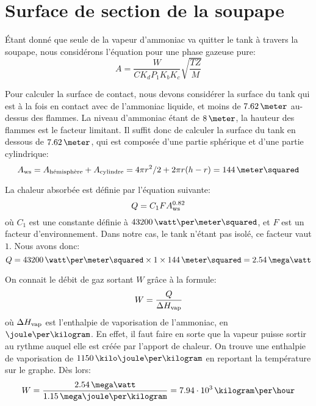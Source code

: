 \section{Surface de section de la soupape}
Étant donné que seule de la vapeur d'ammoniac
va quitter le tank à travers la soupape,
nous considérons l'équation pour une phase gazeuse pure:
\begin{equation}
    \label{eq:big-surface}
    A=\frac{W}{CK_dP_1K_bK_c} \sqrt{\frac{TZ}{M}}
\end{equation}

Pour calculer la surface de contact,
nous devons considérer la surface du tank qui est à la fois en contact
avec de l'ammoniac liquide, et moins de $7.62\,\meter$ au-dessus des flammes.
La niveau d'ammoniac étant de $8\,\meter$,
la hauteur des flammes est le facteur limitant.
Il suffit donc de calculer la surface du tank en dessous de $7.62\,\meter$,
qui est composée d'une partie sphérique et d'une partie cylindrique:
\begin{equation*}
    A\ind{ws} = A\ind{hémisphère} + A\ind{cylindre}
    = 4\pi r^2/2 + 2\pi r (h-r)
    = 144\,\meter\squared
\end{equation*}

La chaleur absorbée est définie par l'équation suivante:
\begin{equation}
    Q = C_1 F A_{\mbox{\scriptsize{ws}}}^{0.82}
\end{equation}
où $C_1$ est une constante définie à $43200\,\watt\per\meter\squared$,
et $F$ est un facteur
d'environnement. Dans notre cas, le tank n'étant pas isolé,
ce facteur vaut $1$. Nous avons donc:
\begin{equation*}
    Q = 43200\,\watt\per\meter\squared \times 1 \times 144\,\meter\squared
    = 2.54\,\mega\watt
\end{equation*}

On connait le débit de gaz sortant $W$ grâce à la formule:
\begin{equation}
    W=\frac{Q}{\Delta H_{\mbox{\scriptsize{vap}}}}
\end{equation}
où $\Delta H_{\mbox{\scriptsize{vap}}}$ est l'enthalpie de vaporisation de l'ammoniac,
en $\joule\per\kilogram$.
En effet, il faut faire en sorte que la vapeur puisse sortir au rythme auquel
elle est créée par l'apport de chaleur.
On trouve une enthalpie de vaporisation de $1150\,\kilo\joule\per\kilogram$
en reportant la température sur le graphe.
Dès lors:
\begin{equation*}
    W = \frac{2.54\,\mega\watt}{1.15\,\mega\joule\per\kilogram}
    = 7.94\cdot10^3\,\kilogram\per\hour
\end{equation*}

